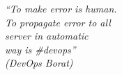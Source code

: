 \begin{epigrafe}
    \vspace*{\fill}
	\begin{flushright}
		\textit{``To make error is human. \\
                          To propagate error to all \\ 
                          server in automatic \\
                          way is \#devops''\\
		(DevOps Borat)}
	\end{flushright}
\end{epigrafe}
